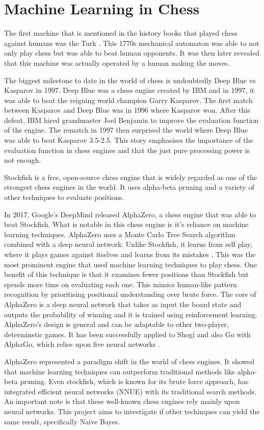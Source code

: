 \section{Machine Learning in Chess}

The first machine that is mentioned in the history books that played chess against humans was the Turk \cite{stephensMechanicalTurkShort2023}. This 1770s mechanical automaton was able to not only play chess but was able to beat human opponents. It was then later revealed that this machine was actually operated by a human making the moves. 

The biggest milestone to date in the world of chess is undoubtedly Deep Blue vs Kasparov in 1997. Deep Blue was a chess engine created by IBM and in 1997, it was able to beat the reigning world champion Garry Kasparov. The first match between Kasparov and Deep Blue was in 1996 where Kasparov won. After this defeat, IBM hired grandmaster Joel Benjamin to improve the evaluation function of the engine. The rematch in 1997 then surprised the world where Deep Blue was able to beat Kasparov 3.5-2.5. This story emphasises the importance of the evaluation function in chess engines and that the just pure processing power is not enough. 

Stockfish is a free, open-source chess engine that is widely regarded as one of the strongest chess engines in the world. It uses alpha-beta pruning and a variety of other techniques to evaluate positions. 

In 2017, Google's DeepMind released AlphaZero, a chess engine that was able to beat Stockfish. What is notable in this chess engine is it's reliance on machine learning techniques. AlphaZero uses a Monte Carlo Tree Search algorithm combined with a deep neural network. Unlike Stockfish, it learns from self play, where it plays games against itselves and learns from its mistakes \cite{kleinNeuralNetworksChess2022}. This was the most prominent engine that used machine learning techniques to play chess. One benefit of this technique is that it examines fewer positions than Stockfish but spends more time on evaluating each one. This mimics human-like pattern recognition by prioritising positional understanding over brute force. The core of AlphaZero is a deep neural network that takes as input the board state and outputs the probability of winning and it is trained using reinforcement learning. AlphaZero's design is general and can be adaptable to other two-player, determinstic games. It has been successfully applied to Shogi and also Go with AlphaGo, which relies upon five neural networks \cite{kleinNeuralNetworksChess2022}.

AlphaZero represented a paradigm shift in the world of chess engines. It showed that machine learning techniques can outperform traditional methods like alpha-beta pruning. Even stockfish, which is known for its brute force approach, has integrated efficient neural networks (NNUE) with its traditional search methods. An important note is that these well-known chess engines rely mainly upon neural networks. This project aims to investigate if other techinques can yield the same result, specifically Naive Bayes.


